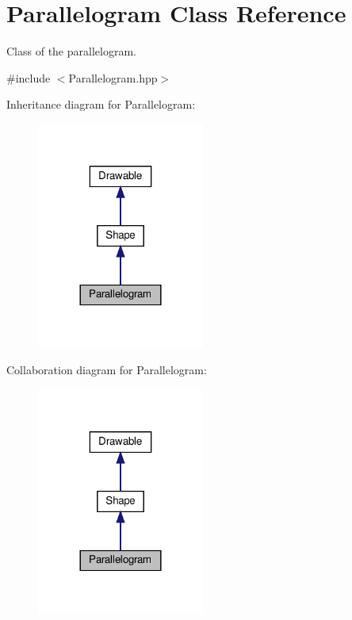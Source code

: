 \hypertarget{classParallelogram}{}\section{Parallelogram Class Reference}
\label{classParallelogram}


Class of the parallelogram.  




{\ttfamily \#include $<$Parallelogram.\+hpp$>$}



Inheritance diagram for Parallelogram\+:\nopagebreak
\begin{figure}[H]
\begin{center}
\leavevmode
\includegraphics[width=156pt]{classParallelogram__inherit__graph}
\end{center}
\end{figure}


Collaboration diagram for Parallelogram\+:\nopagebreak
\begin{figure}[H]
\begin{center}
\leavevmode
\includegraphics[width=156pt]{classParallelogram__coll__graph}
\end{center}
\end{figure}
